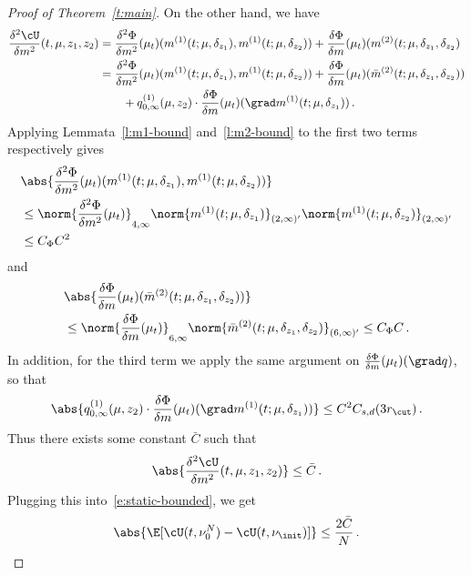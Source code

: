 \documentclass{amsart}
\begin{document}
\begin{proof}[Proof of Theorem~\ref{t:main}]
	On the other hand, we have 
	\begin{align*}
		\frac{\delta^2 \cU}{\delta m^2} (t,\mu,z_1,z_2) & = \frac{\delta^2 \Phi}{\delta m^2}(\mu_t) (m^{(1)}(t;\mu,\delta_{z_1}), m^{(1)}(t;\mu,\delta_{z_2})) + \frac{\delta \Phi}{\delta m} (\mu_t) (m^{(2)}(t;\mu,\delta_{z_1},\delta_{z_2}) \\
		& = \frac{\delta^2 \Phi}{\delta m^2}(\mu_t) (m^{(1)}(t;\mu,\delta_{z_1}), m^{(1)}(t;\mu,\delta_{z_2})) + \frac{\delta \Phi}{\delta m} (\mu_t) (\bar m^{(2)}(t;\mu,\delta_{z_1},\delta_{z_2})) \\
		& \qquad + q^{(1)}_{0,\infty}(\mu,z_2) \cdot \frac{\delta \Phi}{\delta m}(\mu_t) (\grad m^{(1)}(t;\mu,\delta_{z_1})) \,.
	\end{align*}
	Applying Lemmata~\ref{l:m1-bound} and~\ref{l:m2-bound} to the first two terms respectively gives 
	\begin{align*}
		& \abs{\frac{\delta^2 \Phi}{\delta m^2}(\mu_t) (m^{(1)}(t;\mu,\delta_{z_1}), m^{(1)}(t;\mu,\delta_{z_2}))} \\
		& \le \norm{\frac{\delta^2 \Phi}{\delta m^2}(\mu_t) }_{4,\infty} \norm{m^{(1)}(t;\mu,\delta_{z_1})}_{(2,\infty)'} \norm{m^{(1)}(t;\mu,\delta_{z_2})}_{(2,\infty)'} \\
		& \le C_\Phi C^2 
	\end{align*}
	and 
	\begin{align*}
		& \abs{\frac{\delta \Phi}{\delta m} (\mu_t) (\bar m^{(2)}(t;\mu,\delta_{z_1},\delta_{z_2}))} \\
		& \le \norm{\frac{\delta \Phi}{\delta m} (\mu_t)}_{6,\infty} \norm{ \bar m^{(2)}(t;\mu,\delta_{z_1},\delta_{z_2}) }_{(6,\infty)'} \le C_\Phi C \,.
	\end{align*}
	In addition, for the third term we apply the same argument on $\frac{\delta \Phi}{\delta m}(\mu_t) (\grad q)$, so that 
	\begin{equation*}
		\abs{q^{(1)}_{0,\infty}(\mu,z_2) \cdot \frac{\delta \Phi}{\delta m}(\mu_t) (\grad m^{(1)}(t;\mu,\delta_{z_1}))} \le C^2 C_{s,d} (3 r_\cut) \,.
	\end{equation*}
	Thus there exists some constant $\bar C$ such that 
	\begin{equation*}
		\abs{ \frac{\delta^2 \cU}{\delta m^2}(t,\mu,z_1,z_2) } \le \bar C  \,.
	\end{equation*}
	Plugging this into~\eqref{e:static-bounded}, we get 
	\begin{equation*}
		\abs{ \E[\cU(t,\nu^N_0) - \cU(t,\nu_\init)] } \le \frac{2 \bar C}{N} \,.
	\end{equation*}
	

\end{proof}
\end{document}
